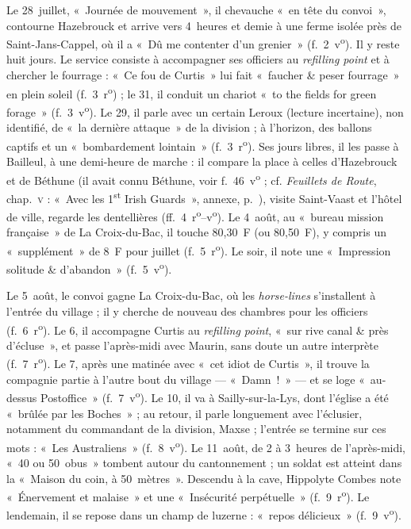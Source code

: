 Le 28~juillet, «~Journée de mouvement~», il chevauche «~en tête du convoi~», contourne Hazebrouck et arrive vers 4~heures et demie à une ferme isolée près de Saint-Jans-Cappel, où il a «~Dû me contenter d'un grenier~» (f.~2~v\textsuperscript{o}). Il y reste huit jours. Le service consiste à accompagner ses officiers au \textit{refilling point} et à chercher le fourrage : «~Ce fou de Curtis~» lui fait «~faucher \& peser fourrage~» en plein soleil (f.~3~r\textsuperscript{o}) ; le 31, il conduit un chariot «~to the fields for green forage~» (f.~3~v\textsuperscript{o}). Le 29, il parle avec un certain Leroux (lecture incertaine), non identifié, de «~la dernière attaque~» de la division ; à l'horizon, des ballons captifs et un «~bombardement lointain~» (f.~3~r\textsuperscript{o}). Ses jours libres, il les passe à Bailleul, à une demi-heure de marche : il compare la place à celles d'Hazebrouck et de Béthune (il avait connu Béthune, voir f.~46~v\textsuperscript{o} ; cf. \textit{Feuillets de Route}, chap.~\textsc{v} : «~Avec les 1\textsuperscript{st} Irish Guards~», annexe, p.~\pageref{annexe:doc6-v}), visite Saint-Vaast et l'hôtel de ville, regarde les dentellières (ff.~4~r\textsuperscript{o}--v\textsuperscript{o}). Le 4~août, au «~bureau mission française~» de La Croix-du-Bac, il touche 80,30~F (ou 80,50~F), y compris un «~supplément~» de 8~F pour juillet (f.~5~r\textsuperscript{o}). Le soir, il note une «~Impression solitude \& d'abandon~» (f.~5~v\textsuperscript{o}).

Le 5~août, le convoi gagne La Croix-du-Bac, où les \textit{horse-lines} s'installent à l'entrée du village ; il y cherche de nouveau des chambres pour les officiers (f.~6~r\textsuperscript{o}). Le 6, il accompagne Curtis au \textit{refilling point}, «~sur rive canal \& près d'écluse~», et passe l'après-midi avec Maurin, sans doute un autre interprète (f.~7~r\textsuperscript{o}). Le 7, après une matinée avec «~cet idiot de Curtis~», il trouve la compagnie partie à l'autre bout du village --- «~Damn~!~» --- et se loge «~au-dessus Postoffice~» (f.~7~v\textsuperscript{o}). Le 10, il va à Sailly-sur-la-Lys, dont l'église a été «~brûlée par les Boches~» ; au retour, il parle longuement avec l'éclusier, notamment du commandant de la division, Maxse ; l'entrée se termine sur ces mots : «~Les Australiens~» (f.~8~v\textsuperscript{o}). Le 11~août, de 2 à 3~heures de l'après-midi, «~40 ou 50~obus~» tombent autour du cantonnement ; un soldat est atteint dans la «~Maison du coin, à 50~mètres~». Descendu à la cave, Hippolyte Combes note «~Énervement et malaise~» et une «~Insécurité perpétuelle~» (f.~9~r\textsuperscript{o}). Le lendemain, il se repose dans un champ de luzerne : «~repos délicieux~» (f.~9~v\textsuperscript{o}).

